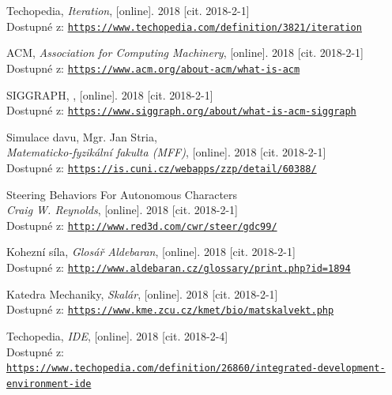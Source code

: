 \documentclass[czech,public,dept460,male,cpdeclaration]{diploma}
\begin{document}
\begin{thebibliography}{99}
	 Techopedia,
		\textit{Iteration}, [online]. 2018 [cit. 2018-2-1]\\
		Dostupné z: \href{https://www.techopedia.com/definition/3821/iteration}{\texttt{https://www.techopedia.com/definition/3821/iteration}}
		
	 ACM,
		\textit{Association for Computing Machinery}, [online]. 2018 [cit. 2018-2-1]\\
		Dostupné z: \href{https://www.acm.org/about-acm/what-is-acm}{\texttt{https://www.acm.org/about-acm/what-is-acm}}
		
	 SIGGRAPH,
		, [online]. 2018 [cit. 2018-2-1]\\
		Dostupné z: \href{https://www.siggraph.org/about/what-is-acm-siggraph}{\texttt{https://www.siggraph.org/about/what-is-acm-siggraph}}
		
	 Simulace davu, Mgr. Jan Stria,\\
		\textit{Matematicko-fyzikální fakulta (MFF)}, [online]. 2018 [cit. 2018-2-1]\\
		Dostupné z: \href{https://is.cuni.cz/webapps/zzp/detail/60388/}{\texttt{https://is.cuni.cz/webapps/zzp/detail/60388/}}
		
	 Steering Behaviors For Autonomous Characters\\
		\textit{Craig W. Reynolds}, [online]. 2018 [cit. 2018-2-1]\\
		Dostupné z: \href{http://www.red3d.com/cwr/steer/gdc99/}{\texttt{http://www.red3d.com/cwr/steer/gdc99/}}
		
	 Kohezní síla,
		\textit{Glosář Aldebaran}, [online]. 2018 [cit. 2018-2-1]\\
		Dostupné z: \href{http://www.aldebaran.cz/glossary/print.php?id=1894}{\texttt{http://www.aldebaran.cz/glossary/print.php?id=1894}}
		
	 Katedra Mechaniky,
		\textit{Skalár}, [online]. 2018 [cit. 2018-2-1]\\
		Dostupné z: \href{https://www.kme.zcu.cz/kmet/bio/matskalvekt.php}{\texttt{https://www.kme.zcu.cz/kmet/bio/matskalvekt.php}}
		
	 Techopedia,
		\textit{IDE}, [online]. 2018 [cit. 2018-2-4]\\
		Dostupné z:\\ \href{https://www.techopedia.com/definition/26860/integrated-development-environment-ide}{\texttt{https://www.techopedia.com/definition/26860/integrated-development-environment-ide}}
		

\end{thebibliography}
\end{document}
